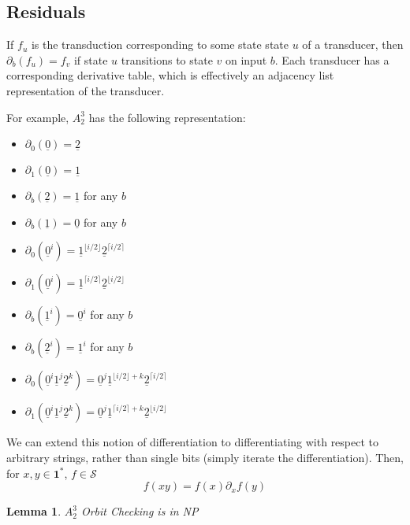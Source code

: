 \documentclass[11pt]{book}
\theoremstyle{pleasant}
\newtheorem{lemma}{Lemma}
\newcommand{\0}{\underline{0}}
\newcommand{\1}{\underline{1}}
\newcommand{\2}{\underline{2}}
\renewcommand{\S}{\mathcal{S}}
\begin{document}

\subsection*{Residuals}
If $f_u$ is the transduction corresponding to some state state $u$ of a transducer, then $\partial_b(f_u) = f_v$ if state $u$ transitions to state $v$ on input $b$. Each transducer has a corresponding derivative table, which is effectively an adjacency list representation of the transducer.

For example, $A^3_2$ has the following representation:

\begin{multicols}{2}
\begin{itemize}
\item $\partial_0(\0) = \2$
\item $\partial_1(\0) = \1$
\item $\partial_b(\2) = \1$ for any $b$
\item $\partial_b(\1) = \0$ for any $b$
\end{itemize}

\begin{itemize}
\item $\partial_0(\0^i) = \1^{\lfloor i / 2 \rfloor}\2^{\lceil i / 2 \rceil}$
\item $\partial_1(\0^i) = \1^{\lceil i / 2 \rceil}\2^{\lfloor i / 2 \rfloor}$
\item $\partial_b(\1^i) = \0^i$ for any $b$
\item $\partial_b(\2^i) = \1^i$ for any $b$
\item $\partial_0(\0^i\1^j\2^k) = \0^j\1^{\lfloor i / 2 \rfloor+k}\2^{\lceil i / 2 \rceil}$
\item $\partial_1(\0^i\1^j\2^k) = \0^j\1^{\lceil i / 2 \rceil+k}\2^{\lfloor i / 2 \rfloor}$
\end{itemize}
\end{multicols}
We can extend this notion of differentiation to differentiating with respect to arbitrary strings, rather than single bits (simply iterate the differentiation). Then, for $x, y \in \textbf{1}^*$, $f \in \S$
$$f(xy) = f(x) \partial_xf(y)$$

\begin{lemma}
$A^3_2$ Orbit Checking is in NP
\end{lemma}
\end{document}
